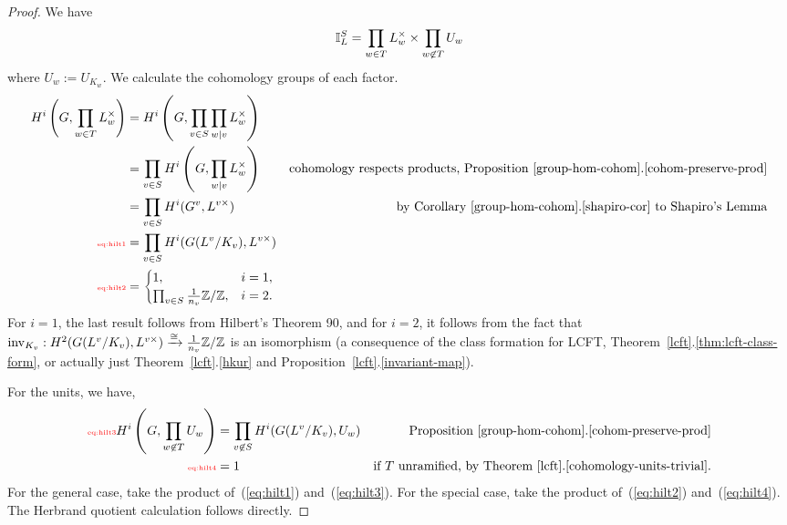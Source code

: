 \begin{proof}
We have
\begin{align*}
\mathbb{I}_L^S=\prod_{w\in T}L_w^{\times}\times  \prod_{w\not\in T} U_w
\end{align*}
where $U_w:=U_{K_w}$. %
We calculate the cohomology groups of each factor.
\begin{align}
\nonumber
H^i\pa{G,\prod_{w\in T}  L_w^{\times} }
&=H^i\pa{G,\prod_{v\in S}\prod_{w\mid v} L_w^{\times}}\\
\nonumber
&=\prod_{v\in S}H^i\pa{G,\prod_{w\mid v} L_w^{\times}}&\text{cohomology respects products, Proposition~\ref{group-hom-cohom}.\ref{cohom-preserve-prod}}\\
\nonumber
&=\prod_{v\in S}H^i(G^v,L^{v\times})&\text{by Corollary~\ref{group-hom-cohom}.\ref{shapiro-cor} to Shapiro's Lemma}\\
\llabel{eq:hilt1}
&=\prod_{v\in S}H^i(G(L^v/K_v),L^{v \times})\\
\llabel{eq:hilt2}
&=
\begin{cases}
1,&i=1,\\
\prod_{v\in S}\rc{n_v}\Z/\Z,&i=2.
\end{cases}
\end{align}
For $i=1$, the last result follows from Hilbert's Theorem 90, and for $i=2$, it follows from the fact that $\operatorname{inv}_{K_v}:H^2(G(L^v/K_v),L^{v\times})\xrightarrow{\cong} \frac{1}{n_v}\mathbb{Z}/\mathbb{Z}$ is an isomorphism (a consequence of the class formation for LCFT, Theorem~\ref{lcft}.\ref{thm:lcft-class-form}, or actually just Theorem~\ref{lcft}.\ref{hkur} and Proposition~\ref{lcft}.\ref{invariant-map}).

For the units, we have, %
\begin{align}
\llabel{eq:hilt3}
H^i\pa{G,\prod_{w\nin T}  U_w }
&=\prod_{v\nin S}H^i(G(L^v/K_v),U_w)&\text{Proposition~\ref{group-hom-cohom}.\ref{cohom-preserve-prod}}\\
\llabel{eq:hilt4}
&=1&\text{if $T$ unramified, by Theorem~\ref{lcft}.\ref{cohomology-units-trivial}.}
\end{align}
For the general case, take the product of~(\ref{eq:hilt1}) and~(\ref{eq:hilt3}). For the special case, take the product of~(\ref{eq:hilt2}) and~(\ref{eq:hilt4}). The Herbrand quotient calculation follows directly.
\end{proof}
